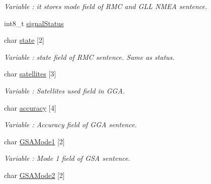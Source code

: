 \begin{DoxyCompactItemize}
\begin{DoxyCompactList}\small\item\em Variable \+: it stores mode field of R\+MC and G\+LL N\+M\+EA sentence. \end{DoxyCompactList}\item 
int8\+\_\+t \hyperlink{class_wasp_g_p_s_af9e9791df9f98a8b48568c658d06c621}{signal\+Status}
\item 
char \hyperlink{class_wasp_g_p_s_aa6a05d9758aca8f23071792a5fabc0ba}{state} \mbox{[}2\mbox{]}\hypertarget{class_wasp_g_p_s_aa6a05d9758aca8f23071792a5fabc0ba}{}\label{class_wasp_g_p_s_aa6a05d9758aca8f23071792a5fabc0ba}

\begin{DoxyCompactList}\small\item\em Variable \+: state field of R\+MC sentence. Same as status. \end{DoxyCompactList}\item 
char \hyperlink{class_wasp_g_p_s_a934517bf8b1951f3439bba96dc3040c8}{satellites} \mbox{[}3\mbox{]}\hypertarget{class_wasp_g_p_s_a934517bf8b1951f3439bba96dc3040c8}{}\label{class_wasp_g_p_s_a934517bf8b1951f3439bba96dc3040c8}

\begin{DoxyCompactList}\small\item\em Variable \+: Satellites used field in G\+GA. \end{DoxyCompactList}\item 
char \hyperlink{class_wasp_g_p_s_aebe47405d30de22844c33de2533191b5}{accuracy} \mbox{[}4\mbox{]}\hypertarget{class_wasp_g_p_s_aebe47405d30de22844c33de2533191b5}{}\label{class_wasp_g_p_s_aebe47405d30de22844c33de2533191b5}

\begin{DoxyCompactList}\small\item\em Variable \+: Accuracy field of G\+GA sentence. \end{DoxyCompactList}\item 
char \hyperlink{class_wasp_g_p_s_a550e60dead1c3923fd8c6198f5ba8ec2}{G\+S\+A\+Mode1} \mbox{[}2\mbox{]}\hypertarget{class_wasp_g_p_s_a550e60dead1c3923fd8c6198f5ba8ec2}{}\label{class_wasp_g_p_s_a550e60dead1c3923fd8c6198f5ba8ec2}

\begin{DoxyCompactList}\small\item\em Variable \+: Mode 1 field of G\+SA sentence. \end{DoxyCompactList}\item 
char \hyperlink{class_wasp_g_p_s_a6678bb8a28a19a4f7d4f920e6f1bc67c}{G\+S\+A\+Mode2} \mbox{[}2\mbox{]}\hypertarget{class_wasp_g_p_s_a6678bb8a28a19a4f7d4f920e6f1bc67c}{}\label{class_wasp_g_p_s_a6678bb8a28a19a4f7d4f920e6f1bc67c}


\end{DoxyCompactItemize}
